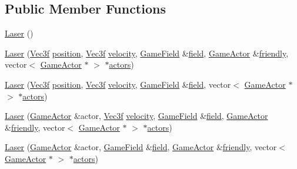 \subsection*{Public Member Functions}
\begin{DoxyCompactItemize}
\item 
\hyperlink{class_laser_a68465e89283dffcc29a37e94693c6f87}{Laser} ()
\item 
\hyperlink{class_laser_a326b845c80bcf384cd91452364805d4d}{Laser} (\hyperlink{class_vec3f}{Vec3f} \hyperlink{class_game_actor_aefed3c91bf32ad388d86657b3bb9ddfa}{position}, \hyperlink{class_vec3f}{Vec3f} \hyperlink{class_game_actor_a95518bf01411eafe983df8815e8682d1}{velocity}, \hyperlink{class_game_field}{Game\+Field} \&\hyperlink{class_game_actor_a0224fbc502abd6b7579787aa234332d5}{field}, \hyperlink{class_game_actor}{Game\+Actor} \&\hyperlink{class_projectile_a54dec73f149e6619fac8f5cf8910edcc}{friendly}, vector$<$ \hyperlink{class_game_actor}{Game\+Actor} $\ast$ $>$ $\ast$\hyperlink{class_game_actor_a2405618d895f5143b42ae9e94d20e693}{actors})
\item 
\hyperlink{class_laser_ae216c244cf3f6bcb4eed9e8b92692182}{Laser} (\hyperlink{class_vec3f}{Vec3f} \hyperlink{class_game_actor_aefed3c91bf32ad388d86657b3bb9ddfa}{position}, \hyperlink{class_vec3f}{Vec3f} \hyperlink{class_game_actor_a95518bf01411eafe983df8815e8682d1}{velocity}, \hyperlink{class_game_field}{Game\+Field} \&\hyperlink{class_game_actor_a0224fbc502abd6b7579787aa234332d5}{field}, vector$<$ \hyperlink{class_game_actor}{Game\+Actor} $\ast$ $>$ $\ast$\hyperlink{class_game_actor_a2405618d895f5143b42ae9e94d20e693}{actors})
\item 
\hyperlink{class_laser_abcdb5d7610f089ddee97c9d512892ce7}{Laser} (\hyperlink{class_game_actor}{Game\+Actor} \&actor, \hyperlink{class_vec3f}{Vec3f} \hyperlink{class_game_actor_a95518bf01411eafe983df8815e8682d1}{velocity}, \hyperlink{class_game_field}{Game\+Field} \&\hyperlink{class_game_actor_a0224fbc502abd6b7579787aa234332d5}{field}, \hyperlink{class_game_actor}{Game\+Actor} \&\hyperlink{class_projectile_a54dec73f149e6619fac8f5cf8910edcc}{friendly}, vector$<$ \hyperlink{class_game_actor}{Game\+Actor} $\ast$ $>$ $\ast$\hyperlink{class_game_actor_a2405618d895f5143b42ae9e94d20e693}{actors})
\item 
\hyperlink{class_laser_ac8b00c242912954900642b341d6e7337}{Laser} (\hyperlink{class_game_actor}{Game\+Actor} \&actor, \hyperlink{class_game_field}{Game\+Field} \&\hyperlink{class_game_actor_a0224fbc502abd6b7579787aa234332d5}{field}, \hyperlink{class_game_actor}{Game\+Actor} \&\hyperlink{class_projectile_a54dec73f149e6619fac8f5cf8910edcc}{friendly}, vector$<$ \hyperlink{class_game_actor}{Game\+Actor} $\ast$ $>$ $\ast$\hyperlink{class_game_actor_a2405618d895f5143b42ae9e94d20e693}{actors})

\end{DoxyCompactItemize}
